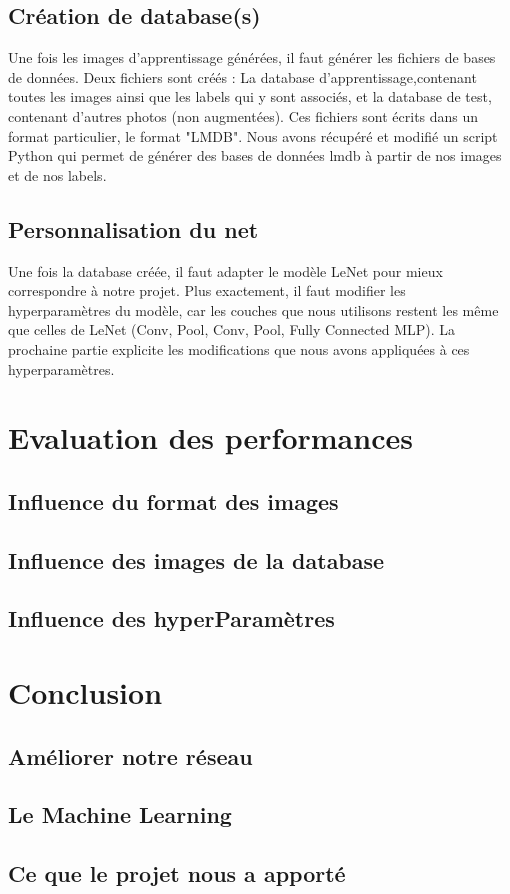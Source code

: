 \documentclass[a4paper,12pt]{article}
\begin{document}
  \subsection{Création de database(s)}
    Une fois les images d'apprentissage générées, il faut générer les fichiers de bases de données. Deux fichiers sont créés : La database d'apprentissage,contenant toutes les images ainsi que les labels qui y sont associés, et la database de test, contenant d'autres photos (non augmentées). Ces fichiers sont écrits dans un format particulier, le format "LMDB". Nous avons récupéré et modifié un script Python qui permet de générer des bases de données lmdb à partir de nos images et de nos labels.
  
  \subsection{Personnalisation du net}
    Une fois la database créée, il faut adapter le modèle LeNet pour mieux correspondre à notre projet. Plus exactement, il faut modifier les hyperparamètres du modèle, car les couches que nous utilisons restent les même que celles de LeNet (Conv, Pool, Conv, Pool, Fully Connected MLP). La prochaine partie explicite les modifications que nous avons appliquées à ces hyperparamètres.

\newpage
\section{Evaluation des performances}
  
  \subsection{Influence du format des images}
  
  \subsection{Influence des images de la database}
  
  \subsection{Influence des hyperParamètres}

\newpage
\section*{Conclusion}
  
  \subsection{Améliorer notre réseau}
  
  \subsection{Le Machine Learning}
  
  \subsection{Ce que le projet nous a apporté}
\end{document}
